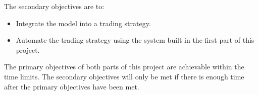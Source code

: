 	The secondary objectives are to:

	\begin{itemize}
		\item Integrate the model into a trading strategy.
		\item Automate the trading strategy using the system built in the first part of this project.
	\end{itemize}	
		
	The primary objectives of both parts of this project are achievable within the time limits. The secondary objectives will only be met if there is enough time after the primary objectives have been met.
	